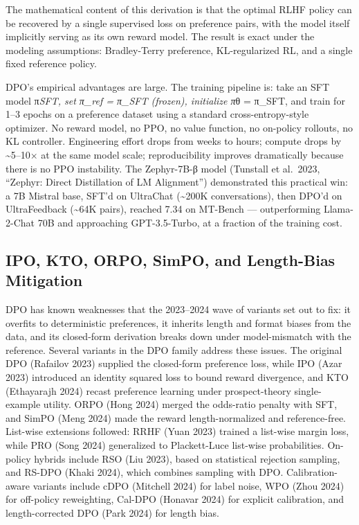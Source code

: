 The mathematical content of this derivation is that the optimal RLHF policy can be recovered by a single supervised loss on preference pairs, with the model itself implicitly serving as its own reward model. The result is exact under the modeling assumptions: Bradley-Terry preference, KL-regularized RL, and a single fixed reference policy.

DPO's empirical advantages are large. The training pipeline is: take an SFT model π\emph{SFT, set π\_ref = π\_SFT (frozen), initialize π}θ = π\_SFT, and train for 1--3 epochs on a preference dataset using a standard cross-entropy-style optimizer. No reward model, no PPO, no value function, no on-policy rollouts, no KL controller. Engineering effort drops from weeks to hours; compute drops by \textasciitilde5--10× at the same model scale; reproducibility improves dramatically because there is no PPO instability. The Zephyr-7B-β model (Tunstall et al.~2023, ``Zephyr: Direct Distillation of LM Alignment'') demonstrated this practical win: a 7B Mistral base, SFT'd on UltraChat (\textasciitilde200K conversations), then DPO'd on UltraFeedback (\textasciitilde64K pairs), reached 7.34 on MT-Bench --- outperforming Llama-2-Chat 70B and approaching GPT-3.5-Turbo, at a fraction of the training cost.

\subsection{IPO, KTO, ORPO, SimPO, and Length-Bias Mitigation}\label{ipo-kto-orpo-simpo-and-length-bias-mitigation}

DPO has known weaknesses that the 2023--2024 wave of variants set out to fix: it overfits to deterministic preferences, it inherits length and format biases from the data, and its closed-form derivation breaks down under model-mismatch with the reference. Several variants in the DPO family address these issues. The original DPO (Rafailov 2023) supplied the closed-form preference loss, while IPO (Azar 2023) introduced an identity squared loss to bound reward divergence, and KTO (Ethayarajh 2024) recast preference learning under prospect-theory single-example utility. ORPO (Hong 2024) merged the odds-ratio penalty with SFT, and SimPO (Meng 2024) made the reward length-normalized and reference-free. List-wise extensions followed: RRHF (Yuan 2023) trained a list-wise margin loss, while PRO (Song 2024) generalized to Plackett-Luce list-wise probabilities. On-policy hybrids include RSO (Liu 2023), based on statistical rejection sampling, and RS-DPO (Khaki 2024), which combines sampling with DPO. Calibration-aware variants include cDPO (Mitchell 2024) for label noise, WPO (Zhou 2024) for off-policy reweighting, Cal-DPO (Honavar 2024) for explicit calibration, and length-corrected DPO (Park 2024) for length bias.

